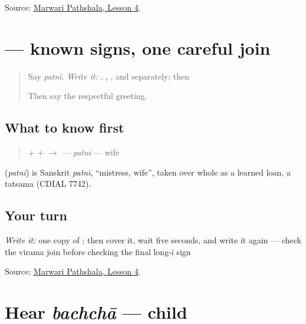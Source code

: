 \begin{tcolorbox}[breakable,colback=teal!4,colframe=teal!35!black,title={Before you move on}]
Source: \href{https://www.marwaripathshala.com/marwari-lesson-4-english}{Marwari Pathshala, Lesson 4}.
\end{tcolorbox}
\section[\texorpdfstring{\mw{पत्नी} (patnī)}{पत्नी (patnī)}]{ — known signs, one careful join}

\label{lesson:MW-C09-patni}



\begin{quote}
Say \emph{patnī}. \emph{Write it:} \textbf{}, \textbf{}, \textbf{}, and \textbf{} separately; then \textbf{}

Then say the respectful \textbf{  } greeting.
\end{quote}

\subsection*{What to know first}
\begin{quote}
\textbf{} + \textbf{} + \textbf{} $\to$ \textbf{} — \emph{patnī} — wife
\end{quote}

\begin{cousinweb}
\textbf{} (\emph{patnī}) is Sanskrit \emph{patnī}, \textquotedblleft{}mistress, wife\textquotedblright{}, taken over whole as a learned loan, a tatsama (CDIAL 7742).
\end{cousinweb}

\subsection*{Your turn}
\emph{Write it:} one copy of \textbf{}; then cover it, wait five seconds, and write it again — check the virama join before checking the final long-ī sign

\begin{tcolorbox}[breakable,colback=teal!4,colframe=teal!35!black,title={Before you move on}]
Source: \href{https://www.marwaripathshala.com/marwari-lesson-4-english}{Marwari Pathshala, Lesson 4}.
\end{tcolorbox}
\section[bachchā]{Hear \emph{bachchā} — child}

